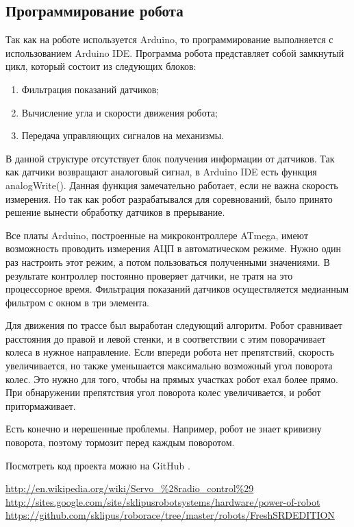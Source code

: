 \documentclass[10pt, a5paper]{article}
\begin{document}
\subsection*{Программирование робота}

Так как на роботе используется Arduino, то программирование выполняется с использованием Arduino IDE. Программа робота представляет собой замкнутый цикл, который состоит из следующих блоков:

\begin{enumerate}
  \item Фильтрация показаний датчиков;
  \item Вычисление угла и скорости движения робота;
  \item Передача управляющих сигналов на механизмы.
\end{enumerate}

В данной структуре отсутствует блок получения информации от датчиков. Так как датчики возвращают аналоговый сигнал, в Arduino IDE есть функция analogWrite(). Данная функция замечательно работает, если не важна скорость измерения. Но так как робот разрабатывался для соревнований, было принято решение вынести обработку датчиков в прерывание.

Все  платы Arduino, построенные на микроконтроллере ATmega, имеют возможность проводить измерения АЦП в автоматическом режиме. Нужно один раз настроить этот режим, а потом пользоваться полученными значениями. В результате контроллер постоянно проверяет датчики, не тратя на это процессорное время. Фильтрация показаний датчиков осуществляется медианным фильтром с окном в три элемента.

Для движения по трассе был выработан следующий алгоритм. Робот сравнивает расстояния до правой и левой стенки, и в соответствии с этим поворачивает колеса в нужное направление. Если впереди робота нет препятствий, скорость  увеличивается, но также уменьшается максимально возможный угол поворота колес. Это нужно для того, чтобы на прямых участках робот ехал более прямо. При обнаружении препятствия угол поворота колес увеличивается, и робот притормаживает.

Есть конечно и нерешенные проблемы. Например, робот не знает кривизну поворота, поэтому тормозит перед каждым поворотом.

Посмотреть код проекта можно на GitHub \cite{bib3}.

\begin{thebibliography}{9}
 \url{http://en.wikipedia.org/wiki/Servo\_\%28radio\_control\%29}
 \url{http://sites.google.com/site/sklipusrobotsystems/hardware/power-of-robot}
 \url{https://github.com/sklipus/roborace/tree/master/robots/FreshSRDEDITION}\end{thebibliography}
\end{document}
